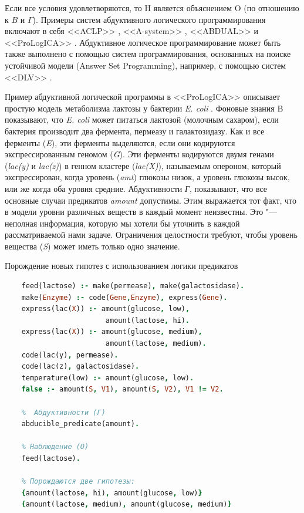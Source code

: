 Если все условия удовлетворяются, то H является объяснением O (по отношению к $B$ и $\Gamma$).  Примеры систем 
абдуктивного логического программирования включают в себя <<ACLP>> \cite{Kakas2000}, <<A-system>> \cite{Nuffelen2001}, 
<<ABDUAL>> \cite{Alferes2004} и <<ProLogICA>> \cite{Ray2006}. Абдуктивное логическое программирование может быть также 
выполнено с помощью систем программирования, основанных на поиске устойчивой модели (Answer Set Programming), например, 
с помощью систем <<DLV>> \cite{Leone2006}. 

Пример абдуктивной логической программы в <<ProLogICA>> описывает простую модель метаболизма лактозы у бактерии 
\textit{E. coli} \cite{Ray2006}. Фоновые знания B показывают, что \textit{E. coli} может питаться лактозой (молочным 
сахаром), если бактерия производит два фермента, пермеазу и галактозидазу. Как и все ферменты (\textit{E}), эти 
ферменты выделяются, если они кодируются экспрессированным геномом (\textit{G}). Эти ферменты кодируются двумя генами 
(\textit{lac(y)} и \textit{lac(z)}) в генном кластере (\textit{lac(X)}), называемым опероном, который экспрессирован, 
когда уровень (\textit{amt}) глюкозы низок, а уровень глюкозы высок, или же когда оба уровня средние. Абдуктивности 
\textit{Г}, показывают, что все основные случаи предикатов \textit{amount} допустимы. Этим выражается тот факт, что 
в модели уровни различных веществ в каждый момент неизвестны. Это "--- неполная информация, которую мы хотели бы 
уточнить в каждой рассматриваемой нами задаче. Ограничения целостности требуют, чтобы уровень вещества (\textit{S}) 
может иметь только одно значение.

\begin{ListingEnv}[!h]%
    \captiondelim{ } %
    \caption{Порождение новых гипотез с использованием логики предикатов}\label{list:generation}
    \begin{lstlisting}[language={Prolog}]
    %  Фоновые знания (B) 
    feed(lactose) :- make(permease), make(galactosidase).
    make(Enzyme) :- code(Gene,Enzyme), express(Gene).
    express(lac(X)) :- amount(glucose, low), 
                        amount(lactose, hi).
    express(lac(X)) :- amount(glucose, medium),
                        amount(lactose, medium).
    code(lac(y), permease).
    code(lac(z), galactosidase).
    temperature(low) :- amount(glucose, low).
    false :- amount(S, V1), amount(S, V2), V1 != V2.
    
    %  Абдуктивности (Г)
    abducible_predicate(amount).
    
    % Наблюдение (O)
    feed(lactose).

    % Порождаются две гипотезы:
    {amount(lactose, hi), amount(glucose, low)}
    {amount(lactose, medium), amount(glucose, medium)}
    \end{lstlisting}
\end{ListingEnv}%

